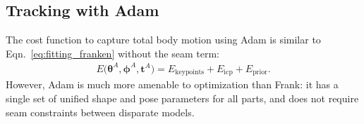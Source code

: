 \subsection{Tracking with Adam}
The cost function to capture total body motion using Adam is similar to Eqn.~\ref{eq:fitting_franken} without the seam term:%
\begin{align}
\label{eq:fitting_adam}
E\big( \boldsymbol{\theta}^A, \boldsymbol{\phi}^A, \boldsymbol{t}^A\big) = E_\textrm{keypoints} + E_\textrm{icp} +E_\textrm{prior}.
\end{align}
However, Adam is much more amenable to optimization than Frank: it has a single set of unified shape and pose parameters for all parts, and does not require seam constraints between disparate models. 






